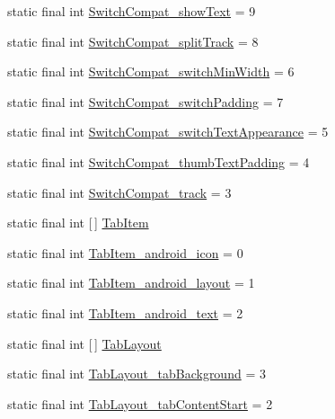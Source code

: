 \begin{DoxyCompactItemize}
\item 
static final int \hyperlink{classproject4_1_1xaria_1_1R_1_1styleable_a14c2b4b128399b1f12166f13c16525d4}{Switch\+Compat\+\_\+show\+Text} = 9
\item 
static final int \hyperlink{classproject4_1_1xaria_1_1R_1_1styleable_a9e4d678c79e9aa05ed9604fba7663099}{Switch\+Compat\+\_\+split\+Track} = 8
\item 
static final int \hyperlink{classproject4_1_1xaria_1_1R_1_1styleable_aecb92273fe1bfad399b3793d1061e0b7}{Switch\+Compat\+\_\+switch\+Min\+Width} = 6
\item 
static final int \hyperlink{classproject4_1_1xaria_1_1R_1_1styleable_a42e6a70d6b1f16cdf82c30ba3a3ac3bd}{Switch\+Compat\+\_\+switch\+Padding} = 7
\item 
static final int \hyperlink{classproject4_1_1xaria_1_1R_1_1styleable_a8e811c82f279d1bba5afc81c9708b5a6}{Switch\+Compat\+\_\+switch\+Text\+Appearance} = 5
\item 
static final int \hyperlink{classproject4_1_1xaria_1_1R_1_1styleable_ad2019cfb3db37eb7854eb363ab28b13c}{Switch\+Compat\+\_\+thumb\+Text\+Padding} = 4
\item 
static final int \hyperlink{classproject4_1_1xaria_1_1R_1_1styleable_af96cd765a1838db8e0772f079ce6fa52}{Switch\+Compat\+\_\+track} = 3
\item 
static final int \mbox{[}$\,$\mbox{]} \hyperlink{classproject4_1_1xaria_1_1R_1_1styleable_aa9568e579aca04aeb8e914ce6277b875}{Tab\+Item}
\item 
static final int \hyperlink{classproject4_1_1xaria_1_1R_1_1styleable_a8d8d3c4695fd974f6288de47645e9ece}{Tab\+Item\+\_\+android\+\_\+icon} = 0
\item 
static final int \hyperlink{classproject4_1_1xaria_1_1R_1_1styleable_a4708f852a2b7a77a451d9c8a9d2cf9f0}{Tab\+Item\+\_\+android\+\_\+layout} = 1
\item 
static final int \hyperlink{classproject4_1_1xaria_1_1R_1_1styleable_a148413384f89d5627ea689b9ed1a8036}{Tab\+Item\+\_\+android\+\_\+text} = 2
\item 
static final int \mbox{[}$\,$\mbox{]} \hyperlink{classproject4_1_1xaria_1_1R_1_1styleable_ab6bfb1f97ae9fba16f4f90d50871d4a8}{Tab\+Layout}
\item 
static final int \hyperlink{classproject4_1_1xaria_1_1R_1_1styleable_a548353c43398409fd3c9188c927aad79}{Tab\+Layout\+\_\+tab\+Background} = 3
\item 
static final int \hyperlink{classproject4_1_1xaria_1_1R_1_1styleable_ab07111454d6d47d52b6dd2500f672524}{Tab\+Layout\+\_\+tab\+Content\+Start} = 2

\end{DoxyCompactItemize}
